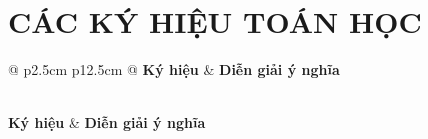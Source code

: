 \documentclass[a4paper,12pt]{article}
\begin{document}
\newpage

\section*{CÁC KÝ HIỆU TOÁN HỌC}

\renewcommand{\arraystretch}{1.5}
\begin{longtable}{@{} p{2.5cm} p{12.5cm} @{}}
    \toprule
    \textbf{Ký hiệu} & \textbf{Diễn giải ý nghĩa} \\ 
    \midrule
    \endfirsthead
    
     \\
    \toprule
    \textbf{Ký hiệu} & \textbf{Diễn giải ý nghĩa} \\ 
    \midrule
    \endhead
    
    \bottomrule
    \endfoot
    
    \bottomrule
    \endlastfoot


\end{longtable}
\end{document}
